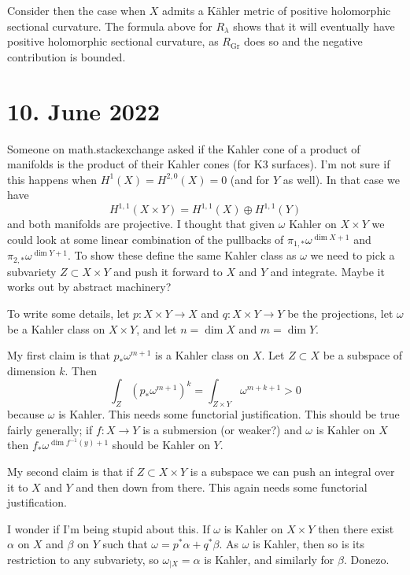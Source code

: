 \documentclass[11pt]{amsart}
\theoremstyle{definition}
\DeclareMathOperator{\Gr}{Gr}
\begin{document}
Consider then the case when $X$ admits a K\"ahler metric of positive holomorphic sectional curvature. The formula above for $R_{\lambda}$ shows that it will eventually have positive holomorphic sectional curvature, as $R_{\Gr}$ does so and the negative contribution is bounded.






\section*{10. June 2022}

Someone on math.stackexchange asked if the Kahler cone of a product of manifolds is the product of their Kahler cones (for K3 surfaces). I'm not sure if this happens when $H^{1}(X) = H^{2,0}(X) = 0$ (and for $Y$ as well). In that case we have
\[
  H^{1,1}(X \times Y) = H^{1,1}(X) \oplus H^{1,1}(Y)
\]
and both manifolds are projective. I thought that given $\omega$ Kahler on $X \times Y$ we could look at some linear combination of the pullbacks of $\pi_{1,*} \omega^{\dim X+1}$ and $\pi_{2,*}\omega^{\dim Y+1}$. To show these define the same Kahler class as $\omega$ we need to pick a subvariety $Z \subset X \times Y$ and push it forward to $X$ and $Y$ and integrate. Maybe it works out by abstract machinery?

To write some details, let $p : X \times Y \to X$ and $q : X \times Y \to Y$ be the projections, let $\omega$ be a Kahler class on $X \times Y$, and let $n = \dim X$ and $m = \dim Y$.

My first claim is that $p_{*} \omega^{m+1}$ is a Kahler class on $X$. Let $Z \subset X$ be a subspace of dimension $k$. Then
\[
  \int_{Z} (p_{*} \omega^{m+1})^{k}
  = \int_{Z \times Y} \omega^{m+k+1}
  > 0
\]
because $\omega$ is Kahler. This needs some functorial justification. This should be true fairly generally; if $f : X \to Y$ is a submersion (or weaker?) and $\omega$ is Kahler on $X$ then $f_{*}\omega^{\dim f^{-1}(y)+1}$ should be Kahler on $Y$.

My second claim is that if $Z \subset X \times Y$ is a subspace we can push an integral over it to $X$ and $Y$ and then down from there. This again needs some functorial justification.

I wonder if I'm being stupid about this. If $\omega$ is Kahler on $X \times Y$ then there exist $\alpha$ on $X$ and $\beta$ on $Y$ such that $\omega = p^{*}\alpha + q^{*}\beta$. As $\omega$ is Kahler, then so is its restriction to any subvariety, so $\omega_{|X} = \alpha$ is Kahler, and similarly for $\beta$. Donezo.
\end{document}
